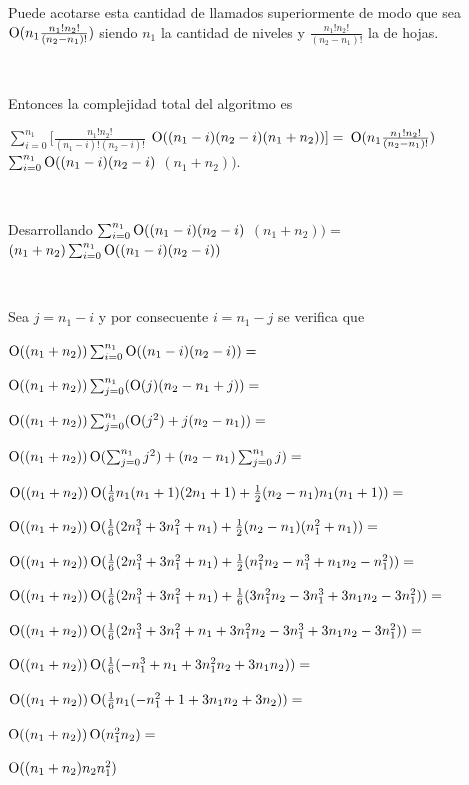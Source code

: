 Puede acotarse esta cantidad de llamados superiormente de modo que sea
$\operatorname{O}(n_1  \frac{n_1!  n_2!}{(n_2 - n_1)!})$ siendo $n_1$ la
cantidad de niveles y $\frac{n_1!  n_2!}{(n_2 - n_1)!}$ la de hojas.

~

Entonces la complejidad total del algoritmo es

$\sum_{i = 0}^{n_1}[\frac{n_1!  n_2!}{(n_1 - i)!  (n_2 - i)!}$
$ \operatorname{O}((n_1 - i)  (n_2 - i)  (n_1 + n_2))]=$
$\operatorname{O}(n_1  \frac{n_1!  n_2!}{(n_2 - n_1)!}) $
$\sum_{i = 0}^{n_1}\operatorname{O}((n_1 - i)  (n_2 - i)$
$ (n_1 + n_2))$.

~

Desarrollando
$\sum_{i = 0}^{n_1}\operatorname{O}((n_1 - i)  (n_2 - i)$
$ (n_1 + n_2))=$
$(n_1 + n_2)  \sum_{i = 0}^{n_1}\operatorname{O}((n_1 - i)  (n_2 - i))$

~

Sea $j = n_1 - i$ y por consecuente $i = n_1 - j$ se verifica que

$\operatorname{O}((n_1 + n_2))  \sum_{i = 0}^{n_1} \operatorname{O}((n_1 - i)  (n_2 - i))=$

$\operatorname{O}((n_1 + n_2))  \sum_{j = 0}^{n_1} (\operatorname{O}(j)  (n_2 - n_1 + j))=$

$\operatorname{O}((n_1 + n_2))  \sum_{j = 0}^{n_1} (\operatorname{O}(j^2) + j  (n_2 - n_1))=$

$\operatorname{O}((n_1 + n_2))  \operatorname{O}(\sum_{j = 0}^{n_1} j^2) + (n_2 - n_1)  \sum_{j = 0}^{n_1} j)=$

$\operatorname{O}((n_1 + n_2))  \operatorname{O}(\frac{1}{6}n_1(n_1 + 1)(2n_1 + 1) + \frac{1}{2}(n_2 - n_1)n_1(n_1 + 1))=$

$\operatorname{O}((n_1 + n_2))  \operatorname{O}(\frac{1}{6}(2n_1^3 + 3n_1^2 + n_1) + \frac{1}{2}(n_2 - n_1)(n_1^2 + n_1))=$

$\operatorname{O}((n_1 + n_2))  \operatorname{O}(\frac{1}{6}(2n_1^3 + 3n_1^2 + n_1) + \frac{1}{2}(n_1^2n_2 - n_1^3 + n_1n_2 - n_1^2))=$

$\operatorname{O}((n_1 + n_2))  \operatorname{O}(\frac{1}{6}(2n_1^3 + 3n_1^2 + n_1) + \frac{1}{6}(3n_1^2n_2 - 3n_1^3 + 3n_1n_2 - 3n_1^2))=$

$\operatorname{O}((n_1 + n_2))  \operatorname{O}(\frac{1}{6}(2n_1^3 + 3n_1^2 + n_1 + 3n_1^2n_2 - 3n_1^3 + 3n_1n_2 - 3n_1^2))=$

$\operatorname{O}((n_1 + n_2))  \operatorname{O}(\frac{1}{6}(-n_1^3 + n_1 + 3n_1^2n_2 + 3n_1n_2))=$

$\operatorname{O}((n_1 + n_2))  \operatorname{O}(\frac{1}{6}n_1(-n_1^2 + 1 + 3n_1n_2 + 3n_2))=$

$\operatorname{O}((n_1 + n_2))  \operatorname{O}(n_1^2n_2)=$

$\operatorname{O}((n_1 + n_2)  n_2  n_1^2)$

~

